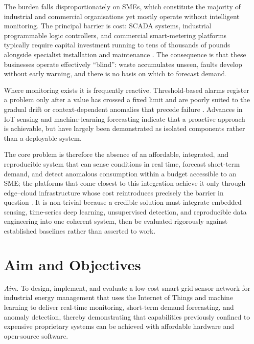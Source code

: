 \documentclass[conference]{IEEEtran}
\begin{document}
The burden falls disproportionately on SMEs, which constitute the majority of
industrial and commercial organisations yet mostly operate without intelligent
monitoring. The principal barrier is cost: SCADA systems, industrial
programmable logic controllers, and commercial smart-metering platforms
typically require capital investment running to tens of thousands of pounds
alongside specialist installation and maintenance
\cite{vijayalakshmi2023smart,silva2023iot}. The consequence is that these
businesses operate effectively ``blind'': waste accumulates unseen, faults
develop without early warning, and there is no basis on which to forecast
demand.
 
Where monitoring exists it is frequently reactive. Threshold-based alarms
register a problem only after a value has crossed a fixed limit and are poorly
suited to the gradual drift or context-dependent anomalies that precede failure
\cite{himeur2021artificial}. Advances in IoT sensing \cite{alaa2017review,hafeez2020efficient} and
machine-learning forecasting \cite{kong2017short,raza2015review} indicate that a proactive approach is achievable, but have largely
been demonstrated as isolated components rather than a deployable system.
 
The core problem is therefore the absence of an affordable, integrated, and reproducible system that can sense conditions in real time, forecast short-term demand, and detect anomalous consumption within a budget accessible to an SME;
the platforms that come closest to this integration achieve it only through edge--cloud infrastructure whose cost reintroduces precisely the barrier in question \cite{bin2022real,ahmed2020machine}.
It is non-trivial because a credible solution must integrate embedded sensing,
time-series deep learning, unsupervised detection, and reproducible data
engineering into one coherent system, then be evaluated rigorously against
established baselines rather than asserted to work.
 
\section{Aim and Objectives}\label{sec:aims}
 
\textit{Aim.} To design, implement, and evaluate a low-cost smart grid sensor
network for industrial energy management that uses the Internet of Things and
machine learning to deliver real-time monitoring, short-term demand
forecasting, and anomaly detection, thereby demonstrating that capabilities
previously confined to expensive proprietary systems can be achieved with
affordable hardware and open-source software.
 
\end{document}
